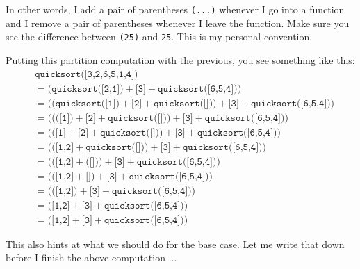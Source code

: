 In other words, I add a pair of parentheses \texttt{(...)} whenever I go into a
function and I remove a pair of parentheses whenever I leave the function.
Make sure you see the difference between 
\texttt{(25)}
and
\texttt{25}.
This is my personal convention.

Putting this partition computation with the previous, you see something
like this:
\begin{align*}
&\texttt{quicksort([3,2,6,5,1,4])} \\
&= \biggl( 
   \texttt{quicksort([2,1])} + 
                \texttt{[3]} +
                \texttt{quicksort([6,5,4])} 
   \biggr)
\\
&= \biggl(
   \biggl(
       \texttt{quicksort([1])} +
       \texttt{[2]} +
       \texttt{quicksort([])} 
   \biggr)
   + \texttt{[3]} 
   + \texttt{quicksort([6,5,4])}
   \biggr)
\\
&= \biggl(
   \biggl(
       \biggl( \texttt{[1]} \biggr) +
       \texttt{[2]} +
       \texttt{quicksort([])} 
   \biggr)
   + \texttt{[3]} 
   + \texttt{quicksort([6,5,4])}   
   \biggr)
\\
&= \biggl(
   \biggl(
       \texttt{[1]} +
       \texttt{[2]} +
       \texttt{quicksort([])} 
   \biggr)
   + \texttt{[3]} 
   + \texttt{quicksort([6,5,4])}
   \biggr)
\\
&= \biggl(
   \biggl(
       \texttt{[1,2]} +
       \texttt{quicksort([])} 
   \biggr)
   + \texttt{[3]} 
   + \texttt{quicksort([6,5,4])}
   \biggr)
\\
&= \biggl(
   \biggl(
       \texttt{[1,2]} +
       \biggl( \texttt{[]} \biggr) 
   \biggr)
   + \texttt{[3]} 
   + \texttt{quicksort([6,5,4])}
   \biggr)
\\
&= \biggl(
   \biggl(
       \texttt{[1,2]} +
       \texttt{[]} 
   \biggr)
   + \texttt{[3]} 
   + \texttt{quicksort([6,5,4])}
   \biggr) 
\\
&= \biggl(
   \biggl(
       \texttt{[1,2]}
   \biggr)
   + \texttt{[3]} 
   + \texttt{quicksort([6,5,4])}
   \biggr)
\\
&= \biggl(
       \texttt{[1,2]}
   + \texttt{[3]} 
   + \texttt{quicksort([6,5,4])}
   \biggr)
\\
&= \biggl(
   \texttt{[1,2]}
   + \texttt{[3]} 
   + \texttt{quicksort([6,5,4])}   
   \biggr)
\end{align*}

This also hints at what we should do for the base case.
Let me write that down before I finish the above
computation ...




